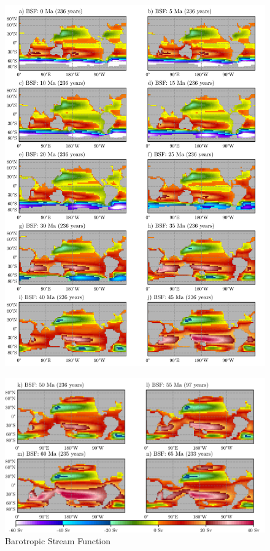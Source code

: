 \documentclass[a4paper]{article}
\begin{document}
\begin{multicols}{2}

\end{multicols}
\begin{figure}[H]

\includegraphics[width=1\linewidth]{BSF_1_crop.pdf}
\end{figure}
\begin{figure}[H]
\includegraphics[width=1\linewidth]{BSF_2_crop.pdf}
\caption{Barotropic Stream Function}
\label{fig:bsf_total}
\end{figure}
\end{document}
